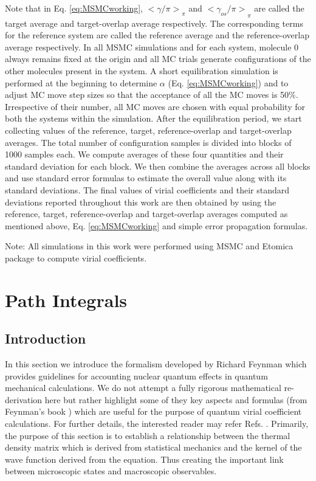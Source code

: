         Note that in Eq. \eqref{eq:MSMCworking}, ${<\gamma/\pi>}_\pi$ and ${<\gamma_{os}/\pi>}_\pi$ are called the target average and target-overlap average respectively. The corresponding terms for the reference system are called the reference average and the reference-overlap average respectively. In all MSMC simulations and for each system, molecule 0 always remains fixed at the origin and all MC trials generate configurations of the other molecules present in the system. A short equilibration simulation is performed at the beginning to determine $\alpha$ (Eq. \eqref{eq:MSMCworking}) and to adjust MC move step sizes so that the acceptance of all the MC moves is 50\%. Irrespective of their number, all MC moves are chosen with equal probability for both the systems within the simulation. After the equilibration period, we start collecting values of the reference, target, reference-overlap and target-overlap averages. The total number of configuration samples is divided into blocks of 1000 samples each. We compute averages of these four quantities and their standard deviation for each block. We then combine the averages across all blocks and use standard error formulas to estimate the overall value along with its standard deviations. The final values of virial coefficients and their standard deviations reported throughout this work are then obtained by using the reference, target, reference-overlap and target-overlap averages computed as mentioned above, Eq. \eqref{eq:MSMCworking} and simple error propagation formulas.

        Note: All simulations in this work were performed using MSMC and Etomica \cite{Schultz2015Etomica} package to compute virial coefficients.

\section{Path Integrals}
    \subsection{Introduction}
    In this section we introduce the formalism developed by Richard Feynman \cite{Feynman} which provides guidelines for accounting nuclear quantum effects in quantum mechanical calculations. We do not attempt a fully rigorous mathematical re-derivation here but rather highlight some of they key aspects and formulas (from Feynman's book \cite{Feynman}) which are useful for the purpose of quantum virial coefficient calculations. For further details, the interested reader may refer Refs. \cite{Fosdick:1966vh,Ceperley1995,Muser1996,Marx1999,Cui1997,Diep2000,Patkowski2008}. Primarily, the purpose of this section is to establish a relationship between the thermal density matrix which is derived from statistical mechanics and the kernel of the wave function derived from the \Schrodinger{} equation. Thus creating the important link between microscopic states and macroscopic observables.

